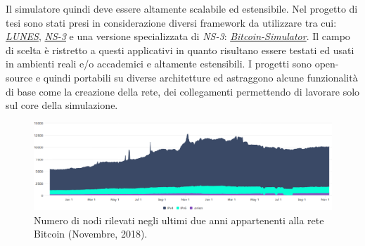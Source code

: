 Il simulatore quindi deve essere altamente scalabile ed estensibile.\newline
Nel progetto di tesi sono stati presi in considerazione diversi framework da utilizzare tra cui: \href{http://pads.cs.unibo.it/doku.php?id=pads:lunes}{\textit{LUNES}}, \href{https://www.nsnam.org/}{\textit{NS-3}} e una versione specializzata di \textit{NS-3}: \href{https://github.com/arthurgervais/Bitcoin-Simulator}{\textit{Bitcoin-Simulator}}. Il campo di scelta è ristretto a questi applicativi in quanto risultano essere testati ed usati in ambienti reali e/o accademici e altamente estensibili. I progetti sono open-source e quindi portabili su diverse architetture ed astraggono alcune funzionalità di base come la creazione della rete, dei collegamenti permettendo di lavorare solo sul core della simulazione.
\begin{figure}
    \includegraphics[width=\textwidth]{images/number_nodes.png}
    \caption{Numero di nodi rilevati negli ultimi due anni appartenenti alla rete Bitcoin (Novembre, 2018).}
\end{figure}

